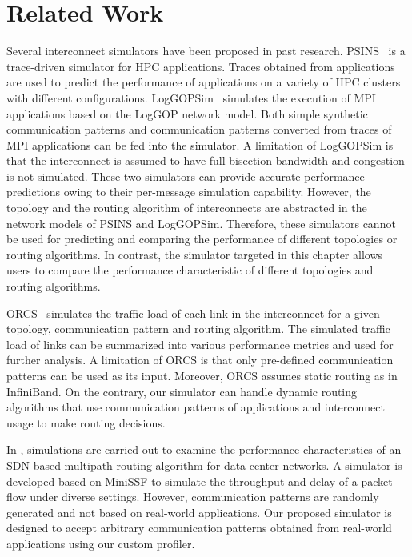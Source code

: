 \section{Related Work}\label{ii-related-work}

Several interconnect simulators have been proposed in past research.
PSINS~\autocite{Tikir2009} is a trace-driven simulator for HPC
applications. Traces obtained from applications are used to predict the
performance of applications on a variety of HPC clusters with different
configurations. LogGOPSim~\autocite{Hoefler2010} simulates the execution
of MPI applications based on the LogGOP network model. Both simple
synthetic communication patterns and communication patterns converted
from traces of MPI applications can be fed into the simulator. A
limitation of LogGOPSim is that the interconnect is assumed to have full
bisection bandwidth and congestion is not simulated. These two
simulators can provide accurate performance predictions owing to their
per-message simulation capability. However, the topology and the routing
algorithm of interconnects are abstracted in the network models of PSINS
and LogGOPSim. Therefore, these simulators cannot be used for predicting
and comparing the performance of different topologies or routing
algorithms. In contrast, the simulator targeted in this chapter allows
users to compare the performance characteristic of different topologies
and routing algorithms.

ORCS~\autocite{Schneider2009} simulates the traffic load of each link in
the interconnect for a given topology, communication pattern and routing
algorithm. The simulated traffic load of links can be summarized into
various performance metrics and used for further analysis. A limitation
of ORCS is that only pre-defined communication patterns can be used as
its input. Moreover, ORCS assumes static routing as in InfiniBand. On
the contrary, our simulator can handle dynamic routing algorithms that
use communication patterns of applications and interconnect usage to
make routing decisions.

In \autocite{Jo2015}, simulations are carried out to examine the
performance characteristics of an SDN-based multipath routing algorithm
for data center networks. A simulator is developed based on MiniSSF to
simulate the throughput and delay of a packet flow under diverse
settings. However, communication patterns are randomly generated and not
based on real-world applications. Our proposed simulator is designed to
accept arbitrary communication patterns obtained from real-world
applications using our custom profiler.

